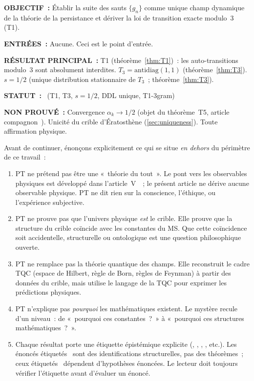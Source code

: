 \documentclass[12pt,a4paper]{article}
\begin{document}
\begin{statusbox}
\textbf{OBJECTIF~:}
  Établir la suite des sauts $\{g_n\}$ comme unique champ dynamique
  de la théorie de la persistance et dériver la loi de transition exacte
  modulo~3 (T1).

\textbf{ENTRÉES~:}
  Aucune. Ceci est le point d'entrée.

\textbf{RÉSULTAT PRINCIPAL~:}
  T1 (théorème~\ref{thm:T1})~: les auto-transitions modulo~3 sont
  absolument interdites.
  $T_3 = \mathrm{antidiag}(1,1)$ (théorème~\ref{thm:T3}).
  $s = 1/2$ (unique distribution stationnaire de $T_3$~; théorème~\ref{thm:T3}).

\textbf{STATUT~:}
  \THMTAG~(T1, T3, $s = 1/2$, DDL unique, T1-3gram)

\textbf{NON PROUVÉ~:}
  Convergence $\alpha_k \to 1/2$ (objet du théorème~T5, article
  compagnon~\cite{companion_M3}).
  Unicité du crible d'Ératosthène (\cref{sec:uniqueness}).
  Toute affirmation physique.
\end{statusbox}

\begin{remarque}
\label{rem:ch1_limits}
Avant de continuer, énonçons explicitement ce qui se situe
\emph{en dehors} du périmètre de ce travail~:
\begin{enumerate}[nosep]
\item PT ne prétend pas être une «~théorie du tout~».
  Le pont vers les observables physiques est développé dans
  l'article~V~\cite{companion_M5}~; le présent article ne dérive aucune
  observable physique. PT ne dit rien sur la conscience, l'éthique,
  ou l'expérience subjective.
\item PT ne prouve pas que l'univers physique \emph{est} le crible.
  Elle prouve que la structure du crible coïncide avec les constantes
  du MS. Que cette coïncidence soit accidentelle, structurelle ou
  ontologique est une question philosophique ouverte.
\item PT ne remplace pas la théorie quantique des champs. Elle
  reconstruit le cadre TQC (espace de Hilbert, règle de Born, règles
  de Feynman) à partir des données du crible, mais utilise le langage
  de la TQC pour exprimer les prédictions physiques.
\item PT n'explique pas \emph{pourquoi} les mathématiques existent.
  Le mystère recule d'un niveau~: de «~pourquoi ces constantes~?~» à
  «~pourquoi ces structures mathématiques~?~».
\item Chaque résultat porte une étiquette épistémique explicite
  (\THMTAG, \IDTAG, \DERTAG, \BRIDGETAG, etc.).
  Les énoncés étiquetés \BRIDGETAG\ sont des identifications
  structurelles, pas des théorèmes~; ceux étiquetés \CONDTAG\ dépendent
  d'hypothèses énoncées. Le lecteur doit toujours vérifier l'étiquette
  avant d'évaluer un énoncé.
\end{enumerate}
\end{remarque}
\end{document}
